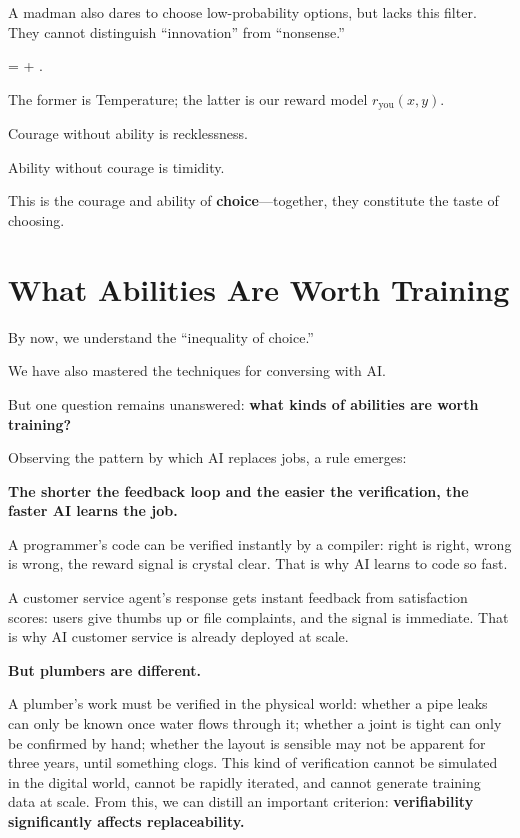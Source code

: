 A madman also dares to choose low-probability options, but lacks this filter. They cannot distinguish ``innovation'' from ``nonsense.''

\vspace{0.6em}

 =  + .

The former is Temperature; the latter is our reward model $r_{\text{you}}(x, y)$.

Courage without ability is recklessness.

Ability without courage is timidity.
\begin{importantbox}
    This is the courage and ability of \textbf{choice}---together, they constitute the taste of choosing.
\end{importantbox}

\newpage
\section{What Abilities Are Worth Training}

By now, we understand the ``inequality of choice.''

We have also mastered the techniques for conversing with AI.

But one question remains unanswered: \textbf{what kinds of abilities are worth training?}

\vspace{1em}

Observing the pattern by which AI replaces jobs, a rule emerges:

\textbf{The shorter the feedback loop and the easier the verification, the faster AI learns the job.}

A programmer's code can be verified instantly by a compiler: right is right, wrong is wrong, the reward signal is crystal clear. That is why AI learns to code so fast.

A customer service agent's response gets instant feedback from satisfaction scores: users give thumbs up or file complaints, and the signal is immediate. That is why AI customer service is already deployed at scale.

\textbf{But plumbers are different.}

A plumber's work must be verified in the physical world: whether a pipe leaks can only be known once water flows through it; whether a joint is tight can only be confirmed by hand; whether the layout is sensible may not be apparent for three years, until something clogs. This kind of verification cannot be simulated in the digital world, cannot be rapidly iterated, and cannot generate training data at scale. From this, we can distill an important criterion: \textbf{verifiability significantly affects replaceability.}

